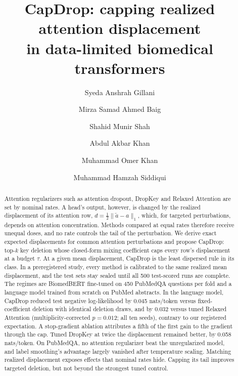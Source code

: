 \documentclass[preprint,12pt,authoryear]{elsarticle}
\begin{document}
\begin{frontmatter}
\title{CapDrop: capping realized attention displacement\\ in data-limited biomedical transformers}

\author[hd]{Syeda Anshrah Gillani}
\author[dan,fq]{Mirza Samad Ahmed Baig}
\author[sz]{Shahid Munir Shah}
\author[ai]{Abdul Akbar Khan}
\author[fx]{Muhammad Omer Khan}
\author[hu]{Muhammad Hamzah Siddiqui}

\begin{abstract}
Attention regularizers such as attention dropout, DropKey and Relaxed Attention are set by nominal rates. A head's
output, however, is changed by the realized displacement of its attention row, $d=\tfrac12\lVert\tilde a-a\rVert_1$,
which, for targeted perturbations, depends on attention concentration. Methods compared at equal rates therefore
receive unequal doses, and no rate controls the tail of the perturbation. We derive exact expected displacements for
common attention perturbations and propose CapDrop: top-$k$ key deletion whose closed-form mixing coefficient caps
every row's displacement at a budget $\tau$. At a given mean displacement, CapDrop is the least dispersed rule in its
class. In a preregistered study, every method is calibrated to the same realized mean displacement, and the test sets
stay sealed until all 500 test-scored runs are complete. The regimes are BiomedBERT fine-tuned on 450 PubMedQA
questions per fold and a language model trained from scratch on PubMed abstracts. In the language model, CapDrop
reduced test negative log-likelihood by 0.045 nats/token versus fixed-coefficient deletion with identical deletion
draws, and by 0.032 versus tuned Relaxed Attention (multiplicity-corrected $p=0.012$; all ten seeds), contrary to our
registered expectation. A stop-gradient ablation attributes a fifth of the first gain to the gradient through the cap.
Tuned DropKey at twice the displacement remained better, by 0.058 nats/token. On PubMedQA, no attention regularizer
beat the unregularized model, and label smoothing's advantage largely vanished after temperature scaling. Matching
realized displacement exposes effects that nominal rates hide. Capping its tail improves targeted deletion, but not
beyond the strongest tuned control.
\end{abstract}


\end{frontmatter}
\end{document}
